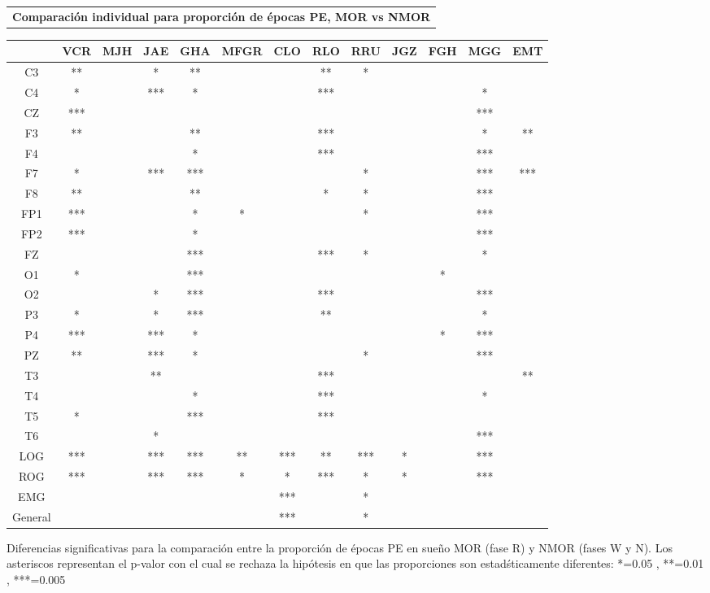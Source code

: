\documentclass[12pt,a4paper]{mitthesis}
\begin{document}
\begin{SidewaysFigure}
\centering
\begin{tabular}{c}
\textbf{Comparaci\'on individual para proporci\'on de \'epocas PE, MOR vs NMOR}
\vspace{1em}
\end{tabular}
\begin{tabular}{c||ccccc||cccc||ccc}
&VCR&MJH&JAE&GHA&MFGR&CLO&RLO&RRU&JGZ&FGH&MGG&EMT \\
\hline
C3&**& &*&**& & &**&*& & & &  \\
C4&*& &***&*& & &***& & & &*&  \\
CZ&***& & & & & & & & & &***&  \\
F3&**& & &**& & &***& & & &*&** \\
F4& & & &*& & &***& & & &***&  \\
F7&*& &***&***& & & &*& & &***&*** \\
F8&**& & &**& & &*&*& & &***&  \\
FP1&***& & &*&*& & &*& & &***&  \\
FP2&***& & &*& & & & & & &***&  \\
FZ& & & &***& & &***&*& & &*&  \\
O1&*& & &***& & & & & &*& &  \\
O2& & &*&***& & &***& & & &***& \\ 
P3&*& &*&***& & &**& & & &*&  \\
P4&***& &***&*& & & & & &*&***&  \\
PZ&**& &***&*& & & &*& & &***&  \\
T3& & &**& & & &***& & & & &** \\
T4& & & &*& & &***& & & &*&  \\
T5&*& & &***& & &***& & & & &  \\
T6& & &*& & & & & & & &***&  \\
LOG&***& &***&***&**&***&**&***&*& &***&  \\
ROG&***& &***&***&*&*&***&*&*& &***&  \\
EMG& & & & & &***& &*& & & &  \\
\hline
General& & & & & &***& &*& & & & 
\end{tabular}
\caption{Diferencias significativas para la comparaci\'on entre la proporci\'on de \'epocas PE en 
sue\~no MOR (fase R) y NMOR (fases W y N).
Los asteriscos representan el p-valor con el cual se rechaza la hip\'otesis en que las proporciones
son estad\'sticamente diferentes: *=0.05 , **=0.01 , ***=0.005}
\label{comparacion_mor_vs_total}
\end{SidewaysFigure}
\end{document}

